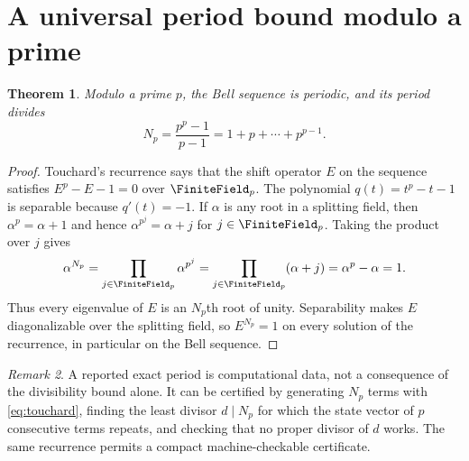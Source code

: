 \documentclass[11pt,a4paper,oneside,openany]{book}
\newtheorem{theorem}{Theorem}[chapter]
\theoremstyle{definition}
\theoremstyle{remark}
\newtheorem{remark}[theorem]{Remark}
\begin{document}
\section{A universal period bound modulo a prime}
\begin{theorem}\label{thm:bell-period-bound}
Modulo a prime $p$, the Bell sequence is periodic, and its period divides
\begin{equation}\label{eq:bell-period-N}
 N_p=\frac{p^p-1}{p-1}=1+p+\cdots+p^{p-1}.
\end{equation}
\end{theorem}
\begin{proof}
Touchard's recurrence says that the shift operator $E$ on the sequence satisfies
$E^p-E-1=0$ over $\FiniteField_p$.  The polynomial $q(t)=t^p-t-1$ is separable because
$q'(t)=-1$.  If $\alpha$ is any root in a splitting field, then
$\alpha^p=\alpha+1$ and hence $\alpha^{p^j}=\alpha+j$ for $j\in\FiniteField_p$.  Taking the
product over $j$ gives
\[
 \alpha^{N_p}=\prod_{j\in\FiniteField_p}\alpha^{p^j}
 =\prod_{j\in\FiniteField_p}(\alpha+j)=\alpha^p-\alpha=1.
\]
Thus every eigenvalue of $E$ is an $N_p$th root of unity.  Separability makes $E$
diagonalizable over the splitting field, so $E^{N_p}=1$ on every solution of the
recurrence, in particular on the Bell sequence.
\end{proof}

\begin{remark}
A reported exact period is computational data, not a consequence of the divisibility
bound alone.  It can be certified by generating $N_p$ terms with
\eqref{eq:touchard}, finding the least divisor $d\mid N_p$ for which the state vector
of $p$ consecutive terms repeats, and checking that no proper divisor of $d$ works.
The same recurrence permits a compact machine-checkable certificate.
\end{remark}
\end{document}
